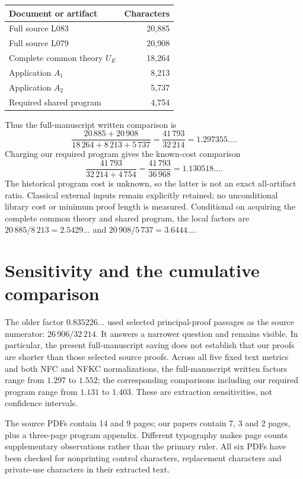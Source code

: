 \documentclass[11pt,a4paper]{article}
\begin{document}
\begin{center}
\begin{tabular}{lr}
\toprule Document or artifact & Characters\\\midrule
Full source L083 & 20,885\\
Full source L079 & 20,908\\
Complete common theory $U_E$ & 18,264\\
Application $A_1$ & 8,213\\
Application $A_2$ & 5,737\\
Required shared program & 4,754\\\bottomrule
\end{tabular}
\end{center}
Thus the full-manuscript written comparison is
\[
 \frac{20\,885+20\,908}{18\,264+8\,213+5\,737}
 =\frac{41\,793}{32\,214}=1.297355\ldots.
\]
Charging our required program gives the known-cost comparison
\[
 \frac{41\,793}{32\,214+4\,754}
 =\frac{41\,793}{36\,968}=1.130518\ldots.
\]
The historical program cost is unknown, so the latter is not an exact
all-artifact ratio. Classical external inputs remain explicitly retained;
no unconditional library cost or minimum proof length is measured.
Conditional on acquiring the complete common theory and shared program,
the local factors are $20\,885/8\,213=2.5429\ldots$ and
$20\,908/5\,737=3.6444\ldots$.

\section{Sensitivity and the cumulative comparison}
The older factor $0.835226\ldots$ used selected principal-proof passages
as the source numerator: $26\,906/32\,214$. It answers a narrower question
and remains visible. In particular, the present full-manuscript saving
does not establish that our proofs are shorter than those selected source
proofs. Across all five fixed text metrics and both NFC and NFKC
normalizations, the full-manuscript written factors range from
$1.297$ to $1.552$; the corresponding comparisons including our required
program range from $1.131$ to $1.403$. These are extraction sensitivities,
not confidence intervals.

The source PDFs contain 14 and 9 pages; our papers contain 7, 3 and 2
pages, plus a three-page program appendix. Different typography makes
page counts supplementary observations rather than the primary ruler.
All six PDFs have been checked for nonprinting control characters,
replacement characters and private-use characters in their extracted text.
\end{document}
